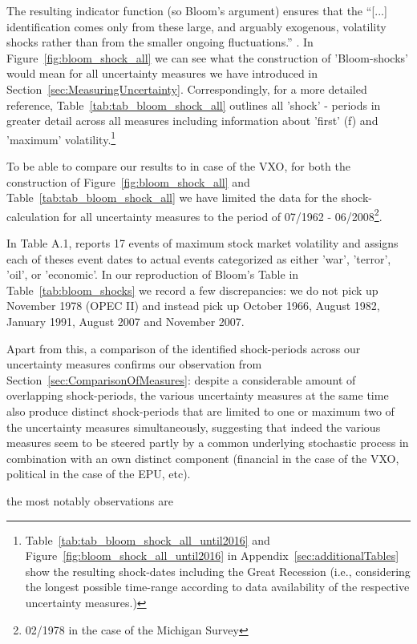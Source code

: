 \documentclass[a4paper,11pt,listof=nochaptergap,oneside,pointednumbers,bibtotoc,bigheadings,liststotoc]{scrbook}
\theoremstyle{mysatz}
\theoremstyle{mydefinition}
\theoremstyle{mybemerkung}
\begin{document}
The resulting indicator function (so Bloom's argument) ensures that the ``[...] identification comes only from these large, and arguably exogenous, volatility shocks rather than from the smaller ongoing fluctuations.'' \citep[p. 630]{bloom:09}. 
In Figure~\ref{fig:bloom_shock_all} we can see what the construction of 'Bloom-shocks' would mean for all uncertainty measures we have introduced in Section~\ref{sec:MeasuringUncertainty}. Correspondingly, for a more detailed reference, Table~\ref{tab:tab_bloom_shock_all} outlines all 'shock' - periods in greater detail across all measures including information about 'first' (f) and 'maximum' volatility.\footnote{Table~\ref{tab:tab_bloom_shock_all_until2016} and Figure~\ref{fig:bloom_shock_all_until2016} in Appendix~\ref{sec:additionalTables} show the resulting shock-dates including the Great Recession (i.e., considering the longest possible time-range according to data availability of the respective uncertainty measures.)} 

To be able to compare our results to \citet{bloom:09} in case of the VXO, for both the construction of Figure~\ref{fig:bloom_shock_all} and Table~\ref{tab:tab_bloom_shock_all} we have limited the data for the shock-calculation for all uncertainty measures to the period of 07/1962 - 06/2008\footnote{02/1978 in the case of the Michigan Survey}. 


In Table A.1, \citet[p. 676]{bloom:09} reports 17 events of maximum stock market volatility and assigns each of theses event dates to actual events categorized as either 'war', 'terror', 'oil', or 'economic'. In our reproduction of Bloom's Table in Table~\ref{tab:bloom_shocks} we record a few discrepancies: we do not pick up November 1978 (OPEC II) and instead pick up October 1966, August 1982, January 1991, August 2007 and November 2007. 

Apart from this, a comparison of the identified shock-periods across our uncertainty measures confirms our observation from Section~\ref{sec:ComparisonOfMeasures}: despite a considerable amount of overlapping shock-periods, the various uncertainty measures at the same time also produce distinct shock-periods that are limited to one or maximum two of the uncertainty measures simultaneously, suggesting that indeed the various measures seem to be steered partly by a common underlying stochastic process in combination with an own distinct component (financial in the case of the VXO, political in the case of the EPU, etc).

the most notably observations are 
\end{document}
